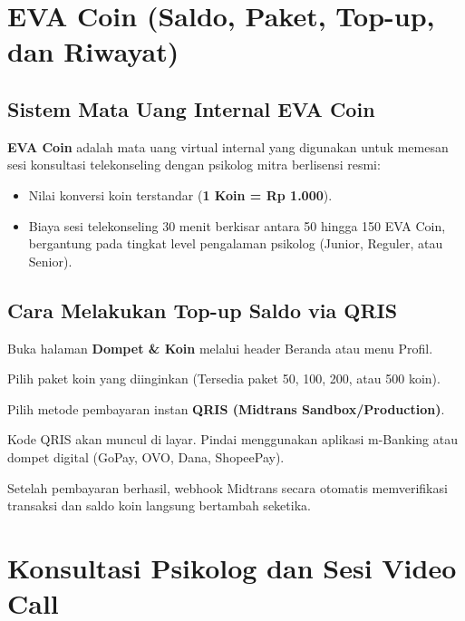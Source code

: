 
\section{EVA Coin (Saldo, Paket, Top-up, dan Riwayat)}

\subsection{Sistem Mata Uang Internal EVA Coin}
\textbf{EVA Coin} adalah mata uang virtual internal yang digunakan untuk memesan sesi konsultasi telekonseling dengan psikolog mitra berlisensi resmi:
\begin{itemize}[leftmargin=1.4em]
  \item Nilai konversi koin terstandar (\textbf{1 Koin = Rp 1.000}).
  \item Biaya sesi telekonseling 30 menit berkisar antara 50 hingga 150 EVA Coin, bergantung pada tingkat level pengalaman psikolog (Junior, Reguler, atau Senior).
\end{itemize}

\subsection{Cara Melakukan Top-up Saldo via QRIS}
\begin{steplist}
  \item Buka halaman \textbf{Dompet \& Koin} melalui header Beranda atau menu Profil.
  \item Pilih paket koin yang diinginkan (Tersedia paket 50, 100, 200, atau 500 koin).
  \item Pilih metode pembayaran instan \textbf{QRIS (Midtrans Sandbox/Production)}.
  \item Kode QRIS akan muncul di layar. Pindai menggunakan aplikasi m-Banking atau dompet digital (GoPay, OVO, Dana, ShopeePay).
  \item Setelah pembayaran berhasil, webhook Midtrans secara otomatis memverifikasi transaksi dan saldo koin langsung bertambah seketika.
\end{steplist}

\section{Konsultasi Psikolog dan Sesi Video Call}

